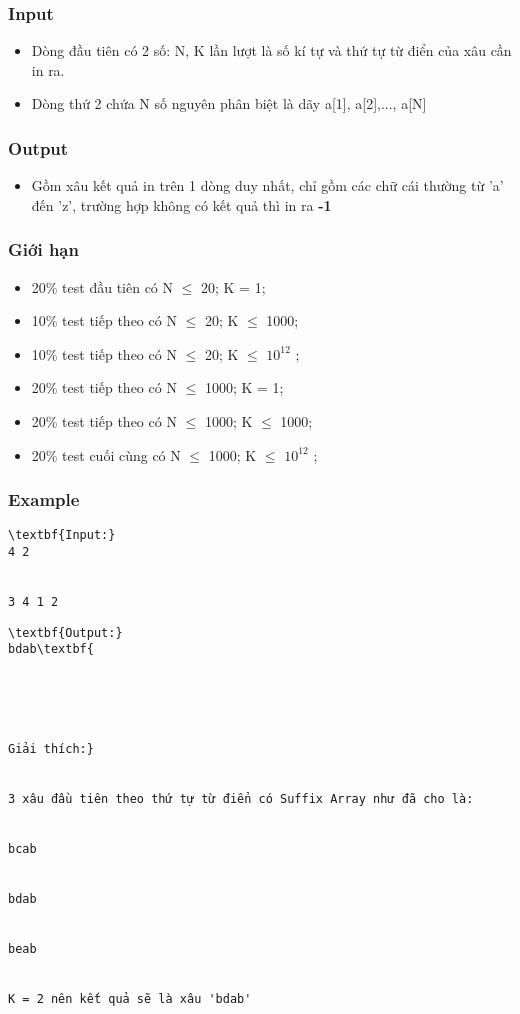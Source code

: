\subsubsection{   Input  }
\begin{itemize}
	\item     Dòng đầu tiên có 2 số: N, K lần lượt là số kí tự và thứ tự từ điển của xâu cần in ra.   
	\item     Dòng thứ 2 chứa N số nguyên phân biệt là dãy a[1], a[2],..., a[N]   
\end{itemize}

\subsubsection{   Output  }
\begin{itemize}
	\item     Gồm xâu kết quả in trên 1 dòng duy nhất, chỉ gồm các chữ cái thường từ 'a' đến 'z', trường hợp không có kết quả thì in ra    \textbf{     -1    }
\end{itemize}

\subsubsection{   Giới hạn  }
\begin{itemize}
	\item     20\% test đầu tiên có N  $\le$  20; K = 1;   
	\item     10\% test tiếp theo có N  $\le$  20; K  $\le$  1000;   
	\item     10\% test tiếp theo có N  $\le$  20; K  $\le$  $10^{12}$    ;   
	\item     20\% test tiếp theo có N  $\le$  1000; K = 1;   
	\item     20\% test tiếp theo có N  $\le$  1000; K  $\le$ 1000;   
	\item     20\% test cuối cùng có N  $\le$  1000; K  $\le$  $10^{12}$    ;   
\end{itemize}

\subsubsection{   Example  }
\begin{verbatim}
\textbf{Input:}
4 2


3 4 1 2\end{verbatim}
\begin{verbatim}
\textbf{Output:}
bdab\textbf{





Giải thích:}


3 xâu đầu tiên theo thứ tự từ điển có Suffix Array như đã cho là:


bcab


bdab


beab


K = 2 nên kết quả sẽ là xâu 'bdab' \end{verbatim}
